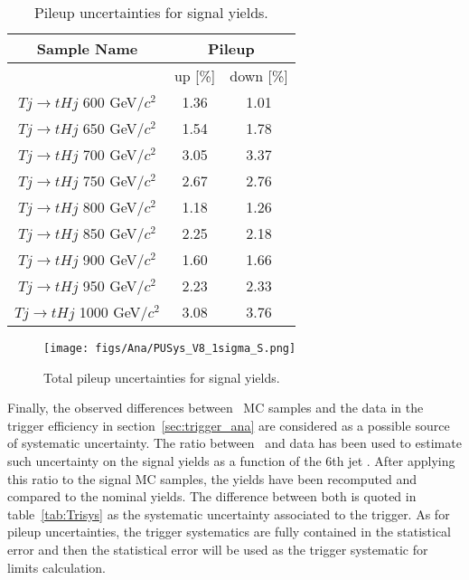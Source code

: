 \begin{table*}[htbH]
\begin{center}
\begin{tabular}{|c|c|c|}
\hline 
Sample Name & \multicolumn{2}{c|}{Pileup} \\
\hline
 & up [\%] & down [\%] \\
\hline
$Tj\rightarrow tHj$ 600 GeV/$c^{2}$ & 1.36 & 1.01 \\
$Tj\rightarrow tHj$ 650 GeV/$c^{2}$ & 1.54 & 1.78 \\
$Tj\rightarrow tHj$ 700 GeV/$c^{2}$ & 3.05 & 3.37 \\
$Tj\rightarrow tHj$ 750 GeV/$c^{2}$ & 2.67 & 2.76 \\
$Tj\rightarrow tHj$ 800 GeV/$c^{2}$ & 1.18 & 1.26 \\
$Tj\rightarrow tHj$ 850 GeV/$c^{2}$ & 2.25 & 2.18 \\
$Tj\rightarrow tHj$ 900 GeV/$c^{2}$ & 1.60 & 1.66 \\
$Tj\rightarrow tHj$ 950 GeV/$c^{2}$ & 2.23 & 2.33 \\
$Tj\rightarrow tHj$ 1000 GeV/$c^{2}$ & 3.08 & 3.76 \\
\hline
\end{tabular}
\caption{Pileup uncertainties for signal yields.\label{tab:PUsys}}
\end{center}
\end{table*}

\begin{figure}[!Hhtbp]
  \begin{center}
    \texttt{[image: figs/Ana/PUSys\_V8\_1sigma\_S.png]}
    \caption{Total pileup uncertainties for signal yields.}
    \label{fig:TotalPUSys}
  \end{center}
\end{figure}

Finally, the observed differences between \ttbar~MC samples and the data in the trigger efficiency in section~\ref{sec:trigger_ana} are considered as a possible source of systematic uncertainty. The ratio between \ttbar~and data has been used to estimate such uncertainty on the signal yields as a function of the 6th jet \pt. After applying this ratio to the signal MC samples, the yields have been recomputed and compared to the nominal yields. The difference between both is quoted in table~\ref{tab:Trisys} as the systematic uncertainty associated to the trigger. As for pileup uncertainties, the trigger systematics are fully contained in the statistical error and then the statistical error will be used as the trigger systematic for limits calculation.

